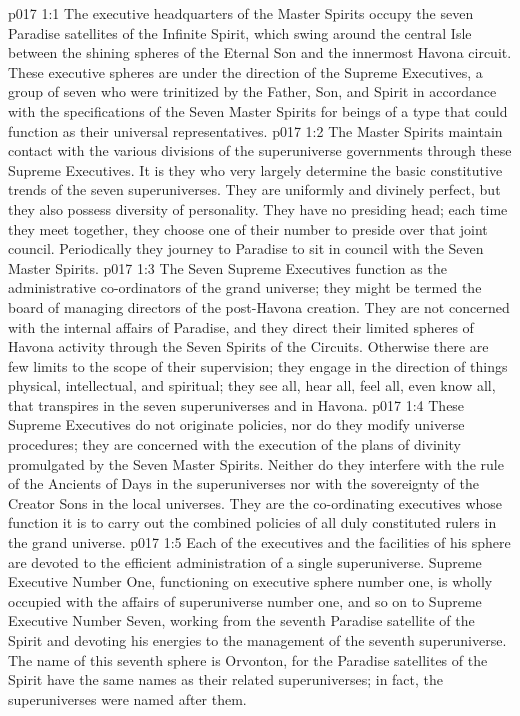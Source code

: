 \vs p017 1:1 The executive headquarters of the Master Spirits occupy the seven Paradise satellites of the Infinite Spirit, which swing around the central Isle between the shining spheres of the Eternal Son and the innermost Havona circuit. These executive spheres are under the direction of the Supreme Executives, a group of seven who were trinitized by the Father, Son, and Spirit in accordance with the specifications of the Seven Master Spirits for beings of a type that could function as their universal representatives.
\vs p017 1:2 The Master Spirits maintain contact with the various divisions of the superuniverse governments through these Supreme Executives. It is they who very largely determine the basic constitutive trends of the seven superuniverses. They are uniformly and divinely perfect, but they also possess diversity of personality. They have no presiding head; each time they meet together, they choose one of their number to preside over that joint council. Periodically they journey to Paradise to sit in council with the Seven Master Spirits.
\vs p017 1:3 \pc The Seven Supreme Executives function as the administrative co\hyp{}ordinators of the grand universe; they might be termed the board of managing directors of the post\hyp{}Havona creation. They are not concerned with the internal affairs of Paradise, and they direct their limited spheres of Havona activity through the Seven Spirits of the Circuits. Otherwise there are few limits to the scope of their supervision; they engage in the direction of things physical, intellectual, and spiritual; they see all, hear all, feel all, even know all, that transpires in the seven superuniverses and in Havona.
\vs p017 1:4 These Supreme Executives do not originate policies, nor do they modify universe procedures; they are concerned with the execution of the plans of divinity promulgated by the Seven Master Spirits. Neither do they interfere with the rule of the Ancients of Days in the superuniverses nor with the sovereignty of the Creator Sons in the local universes. They are the co\hyp{}ordinating executives whose function it is to carry out the combined policies of all duly constituted rulers in the grand universe.
\vs p017 1:5 Each of the executives and the facilities of his sphere are devoted to the efficient administration of a single superuniverse. Supreme Executive Number One, functioning on executive sphere number one, is wholly occupied with the affairs of superuniverse number one, and so on to Supreme Executive Number Seven, working from the seventh Paradise satellite of the Spirit and devoting his energies to the management of the seventh superuniverse. The name of this seventh sphere is Orvonton, for the Paradise satellites of the Spirit have the same names as their related superuniverses; in fact, the superuniverses were named after them.
